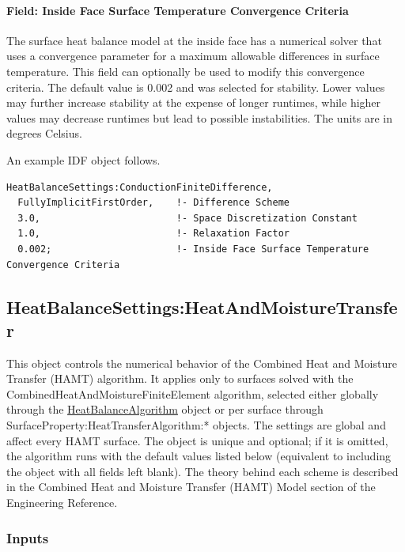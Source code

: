 \paragraph{Field: Inside Face Surface Temperature Convergence Criteria}\label{field-inside-face-surface-temperature-convergence-criteria}

The surface heat balance model at the inside face has a numerical solver that uses a convergence parameter for a maximum allowable differences in surface temperature. This field can optionally be used to modify this convergence criteria. The default value is 0.002 and was selected for stability. Lower values may further increase stability at the expense of longer runtimes, while higher values may decrease runtimes but lead to possible instabilities. The units are in degrees Celsius.

An example IDF object follows.

\begin{lstlisting}
HeatBalanceSettings:ConductionFiniteDifference,
  FullyImplicitFirstOrder,    !- Difference Scheme
  3.0,                        !- Space Discretization Constant
  1.0,                        !- Relaxation Factor
  0.002;                      !- Inside Face Surface Temperature Convergence Criteria
\end{lstlisting}

\subsection{HeatBalanceSettings:HeatAndMoistureTransfer}\label{heatbalancesettingsheatandmoisturetransfer}

This object controls the numerical behavior of the Combined Heat and Moisture Transfer (HAMT) algorithm. It applies only to surfaces solved with the CombinedHeatAndMoistureFiniteElement algorithm, selected either globally through the \hyperref[heatbalancealgorithm]{HeatBalanceAlgorithm} object or per surface through SurfaceProperty:HeatTransferAlgorithm:* objects. The settings are global and affect every HAMT surface. The object is unique and optional; if it is omitted, the algorithm runs with the default values listed below (equivalent to including the object with all fields left blank). The theory behind each scheme is described in the Combined Heat and Moisture Transfer (HAMT) Model section of the Engineering Reference.

\subsubsection{Inputs}\label{inputs-hamt-settings}

